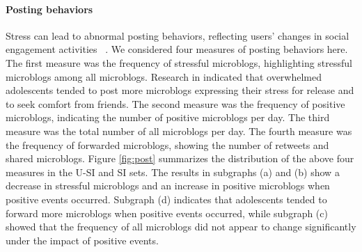 \documentclass[5p,times,numbers,authoryear]{elsarticle}
\begin{document}
\paragraph{\textbf{Posting behaviors}}
Stress can lead to abnormal posting behaviors,
reflecting users' changes in social engagement activities ~\citep{Liang2015Teenagers}.
We considered four measures of posting behaviors here.
The first measure was the frequency of stressful microblogs,
highlighting stressful microblogs among all microblogs.
Research in \cite{Li2017Analyzing} indicated that overwhelmed adolescents
tended to post more microblogs expressing their stress for release and to seek comfort from friends.
The second measure was the frequency of positive microblogs,
indicating the number of positive microblogs per day.
The third measure was the total number of all microblogs per day.
The fourth measure was the frequency of forwarded microblogs,
showing the number of retweets and shared microblogs.
Figure \ref{fig:post} summarizes the distribution of the above four measures in the U-SI and SI sets.
The results in subgraphs (a) and (b) show a decrease in stressful microblogs and an
increase in positive microblogs when positive events occurred.
Subgraph (d) indicates that adolescents tended to forward more microblogs when positive events occurred,
while subgraph (c) showed that the frequency of all microblogs did not appear to change significantly under the impact of positive events.
\end{document}
